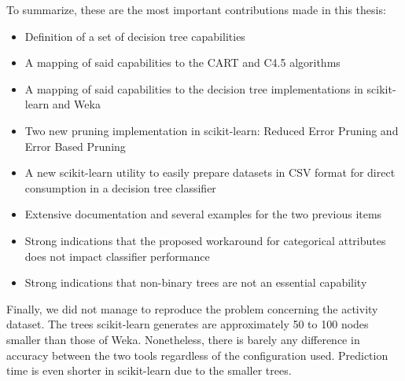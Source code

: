 To summarize, these are the most important contributions made in this thesis:
\begin{itemize}
    \item Definition of a set of decision tree capabilities
    \item A mapping of said capabilities to the CART and C4.5 algorithms 
    \item A mapping of said capabilities to the decision tree implementations in scikit-learn and Weka
    \item Two new pruning implementation in scikit-learn: Reduced Error Pruning and Error Based Pruning
    \item A new scikit-learn utility to easily prepare datasets in CSV format for direct consumption in a decision tree classifier
    \item Extensive documentation and several examples for the two previous items
    \item Strong indications that the proposed workaround for categorical attributes does not impact classifier performance
    \item Strong indications that non-binary trees are not an essential capability
\end{itemize}

Finally, we did not manage to reproduce the problem concerning the activity dataset. The trees scikit-learn generates are approximately 50 to 100 nodes smaller than those of Weka. Nonetheless, there is barely any difference in accuracy between the two tools regardless of the configuration used. Prediction time is even shorter in scikit-learn due to the smaller trees.


